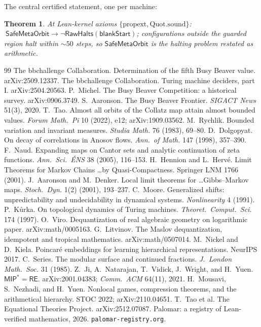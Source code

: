 \documentclass[11pt]{article}
\newtheorem{theorem}{Theorem}
\newcommand{\Halts}{\mathsf{RawHalts}}
\newcommand{\Safe}{\mathsf{SafeMetaOrbit}}
\begin{document}
\medskip
\noindent The central certified statement, one per machine:

\begin{theorem}
At Lean-kernel axioms $\{\mathrm{propext},\mathrm{Quot.sound}\}$:
$\ \Safe \rightarrow \lnot\Halts(\mathsf{blankStart})$; configurations
outside the guarded region halt within $\sim\!50$ steps, so $\Safe$ is
the halting problem restated as arithmetic.
\end{theorem}

\medskip
{\footnotesize
\setlength{\parskip}{0pt}
\begin{thebibliography}{99}\footnotesize
\setlength{\itemsep}{0pt}\setlength{\parsep}{0pt}
 The bbchallenge Collaboration.
Determination of the fifth Busy Beaver value. arXiv:2509.12337.
 The bbchallenge Collaboration.
Turing machine deciders, part I. arXiv:2504.20563.
 P.~Michel. The Busy Beaver Competition: a
historical survey. arXiv:0906.3749.
 S.~Aaronson. The Busy Beaver Frontier.
\emph{SIGACT News} 51(3), 2020.
 T.~Tao. Almost all orbits of the Collatz map
attain almost bounded values. \emph{Forum Math.\ Pi} 10 (2022), e12;
arXiv:1909.03562.
 M.~Rychlik. Bounded variation and invariant
measures. \emph{Studia Math.} 76 (1983), 69--80.
 D.~Dolgopyat. On decay of correlations in Anosov
flows. \emph{Ann.\ of Math.} 147 (1998), 357--390.
 F.~Naud. Expanding maps on Cantor sets and analytic
continuation of zeta functions. \emph{Ann.\ Sci.\ \'ENS} 38 (2005),
116--153.
 H.~Hennion and L.~Herv\'e. Limit Theorems
for Markov Chains \ldots by Quasi-Compactness. Springer LNM 1766
(2001).
 J.~Aaronson and M.~Denker. Local limit
theorems for \ldots Gibbs--Markov maps. \emph{Stoch.\ Dyn.} 1(2)
(2001), 193--237.
 C.~Moore. Generalized shifts: unpredictability and
undecidability in dynamical systems. \emph{Nonlinearity} 4 (1991).
 P.~K\r{u}rka. On topological dynamics of Turing
machines. \emph{Theoret.\ Comput.\ Sci.} 174 (1997).
 O.~Viro. Dequantization of real algebraic geometry on
logarithmic paper. arXiv:math/0005163.
 G.~Litvinov. The Maslov dequantization, idempotent
and tropical mathematics. arXiv:math/0507014.
 M.~Nickel and D.~Kiela. Poincar\'e embeddings
for learning hierarchical representations. NeurIPS 2017.
 C.~Series. The modular surface and continued
fractions. \emph{J.\ London Math.\ Soc.} 31 (1985).
 Z.~Ji, A.~Natarajan, T.~Vidick, J.~Wright, and
H.~Yuen. $\mathsf{MIP}^{*} = \mathsf{RE}$. arXiv:2001.04383;
\emph{Comm.\ ACM} 64(11), 2021.
 H.~Mousavi, S.~Nezhadi, and H.~Yuen. Nonlocal games,
compression theorems, and the arithmetical hierarchy. STOC 2022;
arXiv:2110.04651.
 T.~Tao et al. The Equational Theories Project.
arXiv:2512.07087.
 Palomar: a registry of Lean-verified
mathematics, 2026. \texttt{palomar-registry.org}.
\end{thebibliography}
}
\end{document}
